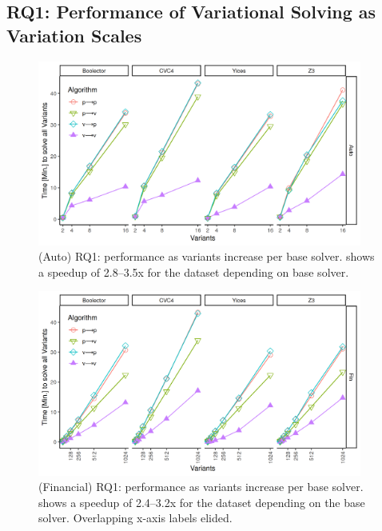 \subsection{RQ1: Performance of Variational Solving as Variation Scales}

\begin{figure}
  \centering
  \includegraphics[width=0.95\textwidth]{Plots/RQ1_Auto}
  \caption{(Auto) RQ1: performance as variants increase per base solver. \vTov{}
    shows a speedup of 2.8--3.5x for the \auto{} dataset depending on base
    solver.}%
  \label{res:rq1:auto}
\end{figure}
%
\begin{figure}
  \centering
  \includegraphics[width=0.95\textwidth]{Plots/RQ1_Fin}
  \caption{(Financial) RQ1: performance as variants increase per base solver. \vTov{}
    shows a speedup of 2.4--3.2x for the \fin{} dataset depending on the base
    solver. Overlapping x-axis labels elided.}%
  \label{res:rq1:fin}
\end{figure}

